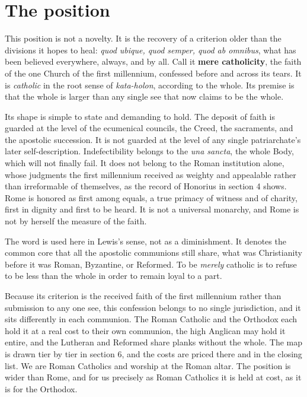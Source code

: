 \documentclass[11pt,twoside]{article}
\newcommand{\unit}[1]{\needspace{3\baselineskip}\par\medskip{\normalfont\bfseries\color{subhead}#1}\par\nobreak\smallskip}
\begin{document}
\section{The position}

This position is not a novelty. It is the recovery of a criterion older than the divisions it hopes to heal: \emph{quod ubique, quod semper, quod ab omnibus}, what has been believed everywhere, always, and by all. Call it \textbf{mere catholicity}, the faith of the one Church of the first millennium, confessed before and across its tears. It is \emph{catholic} in the root sense of \emph{kata-holon}, according to the whole. Its premise is that the whole is larger than any single see that now claims to be the whole.

Its shape is simple to state and demanding to hold. The deposit of faith is guarded at the level of the ecumenical councils, the Creed, the sacraments, and the apostolic succession. It is not guarded at the level of any single patriarchate's later self-description. Indefectibility belongs to the \emph{una sancta}, the whole Body, which will not finally fail. It does not belong to the Roman institution alone, whose judgments the first millennium received as weighty and appealable rather than irreformable of themselves, as the record of Honorius in section 4 shows. Rome is honored as first among equals, a true primacy of witness and of charity, first in dignity and first to be heard. It is not a universal monarchy, and Rome is not by herself the measure of the faith.



\unit{On the word ``merely.''}
The word is used here in Lewis's sense, not as a diminishment. It denotes the common core that all the apostolic communions still share, what was Christianity before it was Roman, Byzantine, or Reformed. To be \emph{merely} catholic is to refuse to be less than the whole in order to remain loyal to a part.

\unit{Whose confession this is.}
Because its criterion is the received faith of the first millennium rather than submission to any one see, this confession belongs to no single jurisdiction, and it sits differently in each communion. The Roman Catholic and the Orthodox each hold it at a real cost to their own communion, the high Anglican may hold it entire, and the Lutheran and Reformed share planks without the whole. The map is drawn tier by tier in section 6, and the costs are priced there and in the closing list. We are Roman Catholics and worship at the Roman altar. The position is wider than Rome, and for us precisely as Roman Catholics it is held at cost, as it is for the Orthodox.
\end{document}
